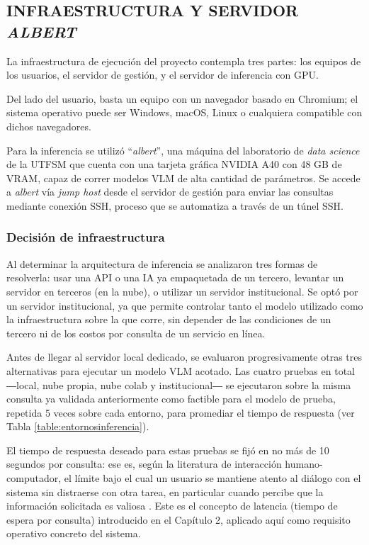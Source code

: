 \subsection{INFRAESTRUCTURA Y SERVIDOR \textit{ALBERT}}

La infraestructura de ejecución del proyecto contempla tres partes: los equipos de los usuarios, el servidor de gestión, y el servidor de inferencia con GPU.

Del lado del usuario, basta un equipo con un navegador basado en Chromium; el sistema operativo puede ser Windows, macOS, Linux o cualquiera compatible con dichos navegadores.

Para la inferencia se utilizó ``\textit{albert}'', una máquina del laboratorio de \textit{data science} de la UTFSM que cuenta con una tarjeta gráfica NVIDIA A40 con 48 GB de VRAM, capaz de correr modelos VLM de alta cantidad de parámetros. Se accede a \textit{albert} vía \textit{jump host} desde el servidor de gestión para enviar las consultas mediante conexión SSH, proceso que se automatiza a través de un túnel SSH.

\subsubsection{Decisión de infraestructura}

Al determinar la arquitectura de inferencia se analizaron tres formas de resolverla: usar una API o una IA ya empaquetada de un tercero, levantar un servidor en terceros (en la nube), o utilizar un servidor institucional. Se optó por un servidor institucional, ya que permite controlar tanto el modelo utilizado como la infraestructura sobre la que corre, sin depender de las condiciones de un tercero ni de los costos por consulta de un servicio en línea.

Antes de llegar al servidor local dedicado, se evaluaron progresivamente otras tres alternativas para ejecutar un modelo VLM acotado. Las cuatro pruebas en total ―local, nube propia, nube colab y institucional― se ejecutaron sobre la misma consulta ya validada anteriormente como factible para el modelo de prueba, repetida 5 veces sobre cada entorno, para promediar el tiempo de respuesta (ver Tabla \ref{table:entornosinferencia}).

El tiempo de respuesta deseado para estas pruebas se fijó en no más de 10 segundos por consulta: ese es, según la literatura de interacción humano-computador, el límite bajo el cual un usuario se mantiene atento al diálogo con el sistema sin distraerse con otra tarea, en particular cuando percibe que la información solicitada es valiosa \cite{nielsen1993responsetimes}. Este es el concepto de latencia (tiempo de espera por consulta) introducido en el Capítulo 2, aplicado aquí como requisito operativo concreto del sistema.

